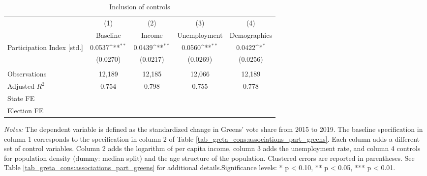 \begin{table}[H]\centering
	\begin{threeparttable}
		\caption{Inclusion of controls}\label{tab_greta_cons:inclusion_controls}
		{\def\sym#1{\ifmmode^{#1}\else\(^{#1}\)\fi} 
			\begin{tabular}{l*{4}{c}}
				\toprule
				&\multicolumn{1}{c}{(1)}&\multicolumn{1}{c}{(2)}&\multicolumn{1}{c}{(3)}&\multicolumn{1}{c}{(4)}\\
				& Baseline & Income & Unemployment &  Demographics \\
				\midrule
			  Participation Index [std.]&      0.0537\sym{**} &      0.0439\sym{**} &      0.0560\sym{**} &      0.0422\sym{*}  \\
										&    (0.0270)         	&    (0.0217)         &    (0.0269)         &    (0.0256)         \\
				\\
				Observations        	&      12,189         &      12,185         &      12,066         &      12,189         \\
				Adjusted $R^2$         	&       0.754         &       0.798         &       0.755         &       0.778         \\			
				State FE				& \checkmark 		  & \checkmark       & \checkmark 	& \checkmark \\
				Election FE				& \checkmark 		  & \checkmark       & \checkmark   & \checkmark \\
				\bottomrule
		\end{tabular}}
		\begin{tablenotes} 
			\item \scriptsize \emph{Notes:} The dependent variable is defined as the standardized change in Greens' vote share from 2015 to 2019. The baseline specification in column 1 corresponds to the specification in column 2 of Table \ref{tab_greta_cons:associations_part_greens}. Each column adds a different set of control variables. Column 2 adds the logarithm of per capita income, column 3 adds the unemployment rate, and column 4 controls for population density (dummy: median split) and the age structure of the population. Clustered errors are reported in parentheses. See Table \ref{tab_greta_cons:associations_part_greens} for additional details.\newline Significance levels: * p < 0.10, ** p < 0.05, *** p < 0.01.
		\end{tablenotes} 
	\end{threeparttable}
\end{table}





